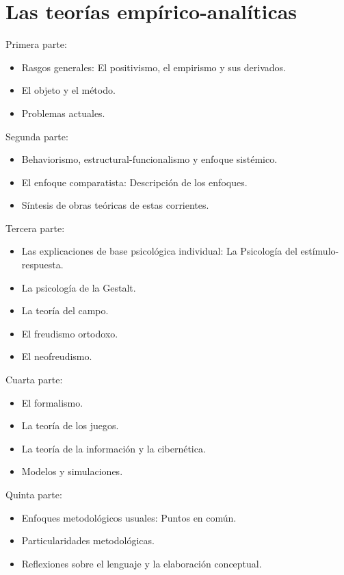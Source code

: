 \documentclass[
]{book}
\providecommand{\tightlist}{%
  \setlength{\itemsep}{0pt}\setlength{\parskip}{0pt}}
\begin{document}
\hypertarget{Lasteoruxedasempuxedricoanaluxedticas}{%
\chapter{Las teorías empírico-analíticas}\label{Lasteoruxedasempuxedricoanaluxedticas}}

Primera parte:

\begin{itemize}
\tightlist
\item
  Rasgos generales: El positivismo, el empirismo y sus derivados.
\item
  El objeto y el método.
\item
  Problemas actuales.
\end{itemize}

Segunda parte:

\begin{itemize}
\tightlist
\item
  Behaviorismo, estructural-funcionalismo y enfoque sistémico.
\item
  El enfoque comparatista: Descripción de los enfoques.
\item
  Síntesis de obras teóricas de estas corrientes.
\end{itemize}

Tercera parte:

\begin{itemize}
\tightlist
\item
  Las explicaciones de base psicológica individual: La Psicología del estímulo-respuesta.
\item
  La psicología de la Gestalt.
\item
  La teoría del campo.
\item
  El freudismo ortodoxo.
\item
  El neofreudismo.
\end{itemize}

Cuarta parte:

\begin{itemize}
\tightlist
\item
  El formalismo.
\item
  La teoría de los juegos.
\item
  La teoría de la información y la cibernética.
\item
  Modelos y simulaciones.
\end{itemize}

Quinta parte:

\begin{itemize}
\tightlist
\item
  Enfoques metodológicos usuales: Puntos en común.
\item
  Particularidades metodológicas.
\item
  Reflexiones sobre el lenguaje y la elaboración conceptual.
\end{itemize}
\end{document}
